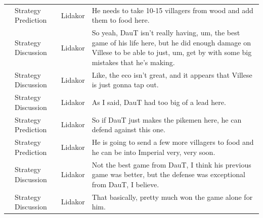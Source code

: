 {\begin{longtable}{@{}>{\theAppRow}r|L{2.3cm}L{1.0cm}U{11.55cm}@{}}
    & Strategy Prediction   & Lidakor & He needs to take 10-15 villagers from wood and add them to food here.                                                                                                                                                                                                                           \\
    & Strategy Discussion   & Lidakor & So yeah, DauT isn't really having, um, the best game of his life here, but he did enough damage on Villese to be able to just, um, get by with some big mistakes that he's making.                                                                                                              \\
    & Strategy Discussion   & Lidakor & Like, the eco isn't great, and it appears that Villese is just gonna tap out.                                                                                                                                                                                                                   \\
    & Strategy Discussion   & Lidakor & As I said, DauT had too big of a lead here.                                                                                                                                                                                                                                                     \\
    & Strategy Prediction   & Lidakor & So if DauT just makes the pikemen here, he can defend against this one.                                                                                                                                                                                                                         \\
    & Strategy Prediction   & Lidakor & He is going to send a few more villagers to food and he can be into Imperial very, very soon.                                                                                                                                                                                                   \\
    & Strategy Discussion   & Lidakor & Not the best game from DauT, I think his previous game was better, but the defense was exceptional from DauT, I believe.                                                                                                                                                                        \\
    & Strategy Discussion   & Lidakor & That basically, pretty much won the game alone for him.                                                                                                                                                                                                                                         \\

\end{longtable}}
